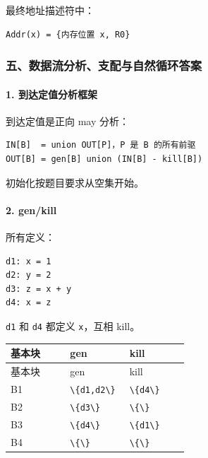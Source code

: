 \documentclass[UTF8]{ctexart}
\begin{document}
最终地址描述符中：

\begin{Verbatim}[fontsize=\small,breaklines=true]
Addr(x) = {内存位置 x, R0}
\end{Verbatim}

\subsubsection*{五、数据流分析、支配与自然循环答案}

\paragraph*{1. 到达定值分析框架}

到达定值是正向 may 分析：

\begin{Verbatim}[fontsize=\small,breaklines=true]
IN[B]  = union OUT[P]，P 是 B 的所有前驱
OUT[B] = gen[B] union (IN[B] - kill[B])
\end{Verbatim}

初始化按题目要求从空集开始。

\paragraph*{2. gen/kill}

所有定义：

\begin{Verbatim}[fontsize=\small,breaklines=true]
d1: x = 1
d2: y = 2
d3: z = x + y
d4: x = z
\end{Verbatim}

\texttt{d1} 和 \texttt{d4} 都定义 \texttt{x}，互相 kill。

\begin{longtable}{|p{0.31\linewidth}|p{0.31\linewidth}|p{0.31\linewidth}|}
\hline
基本块 & gen & kill \\
\hline
\endfirsthead
基本块 & gen & kill \\
\hline
\endhead
B1 & \texttt{\textbackslash{}\{d1,d2\textbackslash{}\}} & \texttt{\textbackslash{}\{d4\textbackslash{}\}} \\
\hline
B2 & \texttt{\textbackslash{}\{d3\textbackslash{}\}} & \texttt{\textbackslash{}\{\textbackslash{}\}} \\
\hline
B3 & \texttt{\textbackslash{}\{d4\textbackslash{}\}} & \texttt{\textbackslash{}\{d1\textbackslash{}\}} \\
\hline
B4 & \texttt{\textbackslash{}\{\textbackslash{}\}} & \texttt{\textbackslash{}\{\textbackslash{}\}} \\
\hline
\end{longtable}
\end{document}
